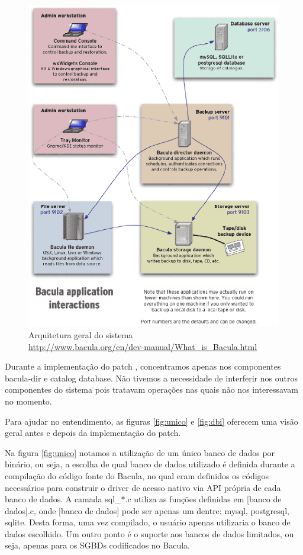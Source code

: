 \begin{figure}[h]
 \centering
 \includegraphics[scale=0.8]{../../doc/figuras/bacula-applications.eps}
 \caption[Arquitetura geral do Bacula]{Arquitetura geral do sistema \\ \url{http://www.bacula.org/en/dev-manual/What_is_Bacula.html}}
 \label{fig:arqbacula}
\end{figure}

Durante a implementação do patch \patchshort, concentramos apenas nos componentes bacula-dir e catalog database. Não tivemos a necessidade de interferir nos outros componentes do sistema pois tratavam operações nas quais não nos interessavam no momento.

Para ajudar no entendimento, as figuras \ref{fig:unico} e \ref{fig:dbi} oferecem uma visão geral antes e depois da implementação do patch. 

Na figura \ref{fig:unico} notamos a utilização de um único banco de dados por binário, ou seja, a escolha de qual banco de dados utilizado é definida durante a compilação do código fonte do Bacula, no qual eram definidos os códigos necessários para construir o driver de acesso nativo via API própria de cada banco de dados. A camada sql\_$\ast$.c utiliza as funções definidas em [banco de dados].c,  onde [banco de dados] pode ser apenas um dentre: mysql, postgresql, sqlite. Desta forma, uma vez compilado, o usuário apenas utilizaria o banco de dados escolhido. 
Um outro ponto é o suporte aos bancos de dados limitados, ou seja, apenas para os SGBDs codificados no Bacula.

